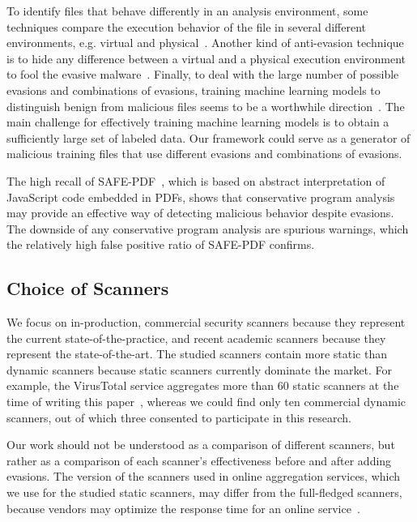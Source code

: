 To identify files that behave differently in an analysis environment, some techniques compare the execution behavior of the file in several different environments, e.g. virtual and physical~\cite{balzarotti2010efficient}.
Another kind of anti-evasion technique is to hide any difference between a virtual and a physical execution environment to fool the evasive malware~\cite{shi2018handling}.
%
Finally, to deal with the large number of possible evasions and combinations of evasions, training machine learning models to distinguish benign from malicious files seems to be a worthwhile direction~\cite{smutz2012malicious,vsrndic2013detection,laskov2011static,corona2014lux0r}.
The main challenge for effectively training machine learning models is to obtain a sufficiently large set of labeled data.
Our framework could serve as a generator of malicious training files that use different evasions and combinations of evasions.

The high recall of SAFE-PDF~\cite{2018arXiv181012490J}, which is based on abstract interpretation of JavaScript code embedded in PDFs, shows that conservative program analysis may provide an effective way of detecting malicious behavior despite evasions. The downside of any conservative program analysis are spurious warnings, which the relatively high false positive ratio of SAFE-PDF confirms.



\subsection{Choice of Scanners}
\label{ss:extension}

We focus on in-production, commercial security scanners because they represent the current state-of-the-practice, and recent academic scanners because they represent the state-of-the-art.
The studied scanners contain more static than dynamic scanners because static scanners currently dominate the market.
For example, the VirusTotal service aggregates more than 60 static scanners at the time of writing this paper~\cite{vt_engines_count}, whereas we could find only ten commercial dynamic scanners, out of which three consented to participate in this research.

Our work should not be understood as a comparison of different scanners, but rather as a comparison of each scanner's effectiveness before and after adding evasions.
The version of the scanners used in online aggregation services, which we use for the studied static scanners, may differ from the full-fledged scanners, because vendors may optimize the response time for an online service~\cite{pitfall}.

